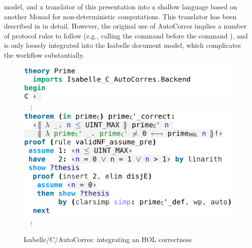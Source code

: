 \begin{isabellebody}
\begin{isamarkuptext}
model, and a translator of this presentation into a shallow language based on another Monad for
non-deterministic computations. This translator has been described in \cite{DBLP:conf/pldi/GreenawayLAK14,DBLP:conf/tphol/WinwoodKSACN09} in detail. However, the
original use of AutoCorres implies a number of protocol rules to follow (e.g., calling the command
 before the command
), and is only loosely integrated into the Isabelle document
model, which complicates the workflow substantially.%
\end{isamarkuptext}\isamarkuptrue%
%
\begin{isamarkuptext}%
\begin{figure}
  \centering
\begin{minipage}{0.48\textwidth}
\includegraphics[width=\textwidth]{figures/A-C-Source80}\vspace{-3pt}\hfill\allowbreak%
\vspace{0pt}$\quad\vdots$\vspace{2pt}\hfill\allowbreak%
\includegraphics[width=\textwidth]{figures/A-C-Source8}\vspace{-3pt}\hfill\allowbreak%
\vspace{0pt}$\quad\vdots$\vspace{2pt}\hfill\allowbreak%
\end{minipage}
  \caption{Isabelle/C/AutoCorres: integrating an HOL correctness \\
}
\end{figure}
\end{isamarkuptext}
\end{isabellebody}
